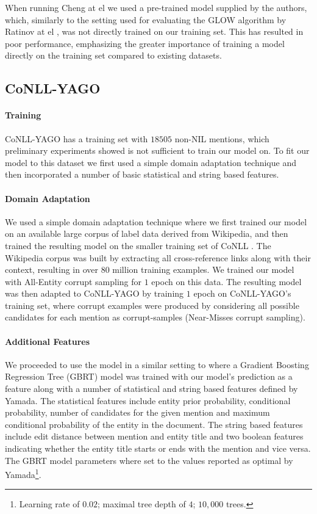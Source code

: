 \documentclass[11pt]{article}
\begin{document}
	When running Cheng at el  we used a pre-trained model supplied by the authors, which, similarly to the setting used for evaluating the GLOW algorithm by Ratinov at el \cite{ratinov2011glow}, was not directly trained on our training set. This has resulted in poor performance, emphasizing the greater importance of training a model directly on the training set compared to existing datasets.
	
	\subsection{CoNLL-YAGO}
	\label{experiments-conll}
	
	\paragraph{Training}
	CoNLL-YAGO has a training set with $18505$ non-NIL mentions, which preliminary experiments showed is not sufficient to train our model on. To fit our model to this dataset we first used a simple domain adaptation technique and then incorporated a number of basic statistical and string based features.
	
	\paragraph{Domain Adaptation}
	We used a simple domain adaptation technique where we first trained our model on an available large corpus of label data derived from Wikipedia, and then trained the resulting model on the smaller training set of CoNLL \cite{mou2016How}. The Wikipedia corpus was built by extracting all cross-reference links along with their context, resulting in over $80$ million training examples. We trained our model with All-Entity corrupt sampling for $1$ epoch on this data. The resulting model was then adapted to CoNLL-YAGO by training $1$ epoch on CoNLL-YAGO's training set, where corrupt examples were produced by considering all possible candidates for each mention as corrupt-samples (Near-Misses corrupt sampling).

	\paragraph{Additional Features}	
	We proceeded to use the model in a similar setting to  where a Gradient Boosting Regression Tree (GBRT) \cite{friedman2001greedy} model was trained with our model's prediction as a feature along with a number of statistical and string based features defined by Yamada. The statistical features include entity prior probability, conditional probability, number of candidates for the given mention and maximum conditional probability of the entity in the document. The string based features include edit distance between mention and entity title and two boolean features indicating whether the entity title starts or ends with the mention and vice versa. The GBRT model parameters where set to the values reported as optimal by Yamada\footnote{Learning rate of $0.02$; maximal tree depth of $4$; $10,000$ trees.}.
			
\end{document}
